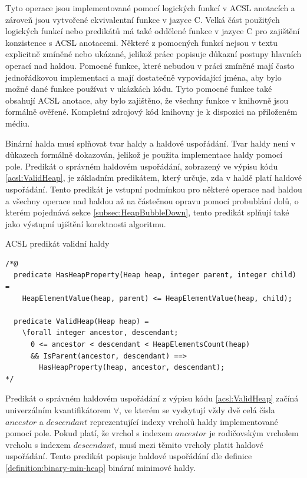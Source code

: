 Tyto operace jsou implementované pomocí logických funkcí v ACSL anotacích a zároveň jsou vytvořené ekvivalentní funkce v jazyce C. Velká část použitých logických funkcí nebo predikátů má také oddělené funkce v jazyce C pro zajištění konzistence s ACSL anotacemi. Některé z pomocných funkcí nejsou v textu explicitně zmíněné nebo ukázané, jelikož práce popisuje důkazní postupy hlavních operací nad haldou. Pomocné funkce, které nebudou v práci zmíněné mají často jednořádkovou implementaci a mají dostatečně vypovídající jména, aby bylo možné dané funkce používat v ukázkách kódu. Tyto pomocné funkce také obsahují ACSL anotace, aby bylo zajištěno, že všechny funkce v knihovně jsou formálně ověřené. Kompletní zdrojový kód knihovny je k dispozici na přiloženém médiu.

Binární halda musí splňovat tvar haldy a haldové uspořádání. Tvar haldy není v důkazech formálně dokazován, jelikož je použita implementace haldy pomocí pole. Predikát o správném haldovém uspořádání, zobrazený ve výpisu kódu \ref{acsl:ValidHeap}, je základním predikátem, který určuje, zda v haldě platí haldové uspořádání. Tento predikát je vstupní podmínkou pro některé operace nad haldou a všechny operace nad haldou až na částečnou opravu pomocí probublání dolů, o kterém pojednává sekce \ref{subsec:HeapBubbleDown}, tento predikát splňují také jako výstupní ujištění korektnosti algoritmu.

\begin{listing}[H]
	\caption{ACSL predikát validní haldy}
	\label{acsl:ValidHeap}
	\begin{verbatim}
/*@
  predicate HasHeapProperty(Heap heap, integer parent, integer child) =
    HeapElementValue(heap, parent) <= HeapElementValue(heap, child);

  predicate ValidHeap(Heap heap) =
    \forall integer ancestor, descendant;
      0 <= ancestor < descendant < HeapElementsCount(heap)
      && IsParent(ancestor, descendant) ==>
        HasHeapProperty(heap, ancestor, descendant);
*/
	\end{verbatim}
\end{listing}

Predikát o správném haldovém uspořádání z výpisu kódu \ref{acsl:ValidHeap} začíná univerzálním kvantifikátorem $\forall$, ve kterém se vyskytují vždy dvě celá čísla $ancestor$ a $descendant$ reprezentující indexy vrcholů haldy implementované pomocí pole. Pokud platí, že vrchol s indexem $ancestor$ je rodičovským vrcholem vrcholu s indexem $descendant$, musí mezi těmito vrcholy platit haldové uspořádání. Tento predikát popisuje haldové uspořádání dle definice \ref{definition:binary-min-heap} binární minimové haldy. 

